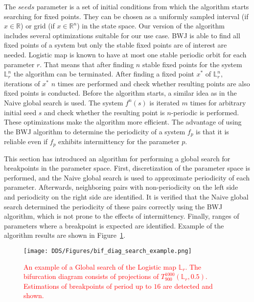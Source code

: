 The $seeds$ parameter is a set of initial conditions from which the algorithm starts searching for fixed points.
They can be chosen as a uniformly sampled interval (if $x \in \mathbb{R}$) or grid (if $x \in \mathbb{R}^{n}$) in the state space.
Our version of the algorithm includes several optimizations suitable for our use case.
BWJ is able to find all fixed points of a system but only the stable fixed points are of interest are needed.
Logistic map is known to have at most one stable periodic orbit for each parameter $r$.
That means that after finding $n$ stable fixed points for the system $\mathbb{L}_{r}^{n}$ the algorithm can be terminated.
After finding a fixed point $x^{*}$ of $\mathbb{L}_{r}^{n}$, iterations of $x^{*}$ $n$ times are performed and check whether resulting points are also fixed points is conducted.
Before the algorithm starts, a similar idea as in the Naive global search is used.
The system $f^{n}(s)$ is iterated $m$ times for arbitrary initial seed $s$ and check whether the resulting point is $n$-periodic is performed.
These optimizations make the algorithm more efficient.
The advantage of using the BWJ algorithm to determine the periodicity of a system $f_{p}$ is that it is reliable even if $f_{p}$ exhibits intermittency for the parameter $p$.
\par
This section has introduced an algorithm for performing a global search for breakpoints in the parameter space.
First, discretization of the parameter space is performed, and the Naive global search is used to approximate periodicity of each parameter.
Afterwards, neighboring pairs with non-periodicity on the left side and periodicity on the right side are identified.
It is verified that the Naive global search determined the periodicity of these pairs correctly using the BWJ algorithm, which is not prone to the effects of intermittency.
Finally, ranges of parameters where a breakpoint is expected are identified.
Example of the algorithm results are shown in Figure~\ref{fig:bif_diag_search_example}.

\begin{figure}[!h]
    \centering
    \texttt{[image: DDS/Figures/bif\_diag\_search\_example.png]}
    \caption{
        \textcolor{red}{
        An example of a Global search of the Logistic map $\mathbb{L}_{r}$.
        The bifurcation diagram consists of projections of $T_{900}^{1000}(\mathbb{L}_{r}, 0.5)$.
        Estimations of breakpoints of period up to $16$ are detected and shown.
        }
    }
    \label{fig:bif_diag_search_example}
\end{figure}

